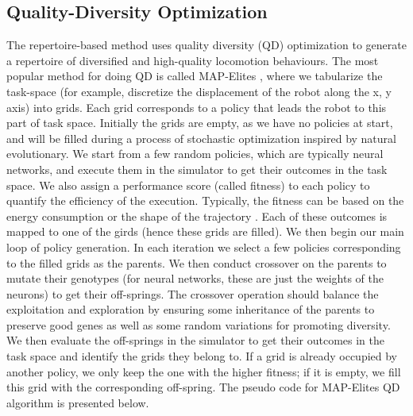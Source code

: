 \documentclass[journal]{IEEEtran}
\begin{document}
\subsection{Quality-Diversity Optimization}
The repertoire-based method uses quality diversity (QD) optimization to generate a repertoire of diversified and high-quality locomotion behaviours. 
The most popular method for doing QD is called MAP-Elites \cite{QD, Map-Elites}, where we tabularize the task-space (for example, discretize the displacement of the robot along the x, y axis) into grids. 
Each grid corresponds to a policy that leads the robot to this part of task space. 
Initially the grids are empty, as we have no policies at start, and will be filled during a process of stochastic optimization inspired by natural evolutionary. 
We start from a few random policies, which are typically neural networks, and execute them in the simulator to get their outcomes in the task space. 
We also assign a performance score (called fitness) to each policy to quantify the efficiency of the execution. Typically, the fitness can be based on the energy consumption \cite{Q-Dax} or the shape of the trajectory \cite{evorbc_conf}.
Each of these outcomes is mapped to one of the girds (hence these grids are filled). 
We then begin our main loop of policy generation. 
In each iteration we select a few policies corresponding to the filled grids as the parents. We then conduct crossover on the parents to mutate their genotypes (for neural networks, these are just the weights of the neurons) to get their off-springs. 
The crossover operation should balance the exploitation and exploration by ensuring some inheritance of the parents to preserve good genes as well as some random variations for promoting diversity.
We then evaluate the off-springs in the simulator to get their outcomes in the task space and identify the grids they belong to.
If a grid is already occupied by another policy, we only keep the one with the higher fitness; if it is empty, we fill this grid with the corresponding off-spring. 
The pseudo code for MAP-Elites QD algorithm is presented below.
\end{document}
